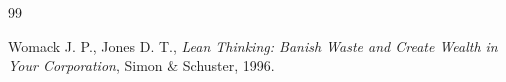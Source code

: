 \clearpage


\renewcommand{\bibname}{Bibliographie}
\begin{thebibliography}{99}
\pagestyle{noheaderpagenum}
\thispagestyle{noheaderpagenum}

    Womack J. P., Jones D. T., \textit{Lean Thinking: Banish Waste and Create Wealth in Your Corporation}, Simon \& Schuster, 1996.

\end{thebibliography}

\setcounter{lastbibitem}{\value{enumiv}}
\pagestyle{fancy}